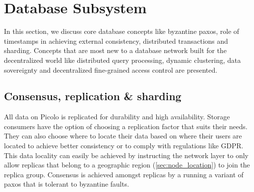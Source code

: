 \section{Database Subsystem}
In this section, we discuss core database concepts like byzantine paxos, role of timestamps in achieving external consistency, distributed transactions and sharding. Concepts that are most new to a database network built for the  decentralized world like distributed query processing, dynamic clustering, data sovereignty and decentralized fine-grained access control are presented.

\subsection{Consensus, replication \& sharding} \label{sec:paxos}
All data on Picolo is replicated for durability and high availability. Storage consumers have the option of choosing a replication factor that suits their needs. They can also choose where to locate their data based on where their users are located to achieve better consistency or to comply with regulations like GDPR. This data locality can easily be achieved by instructing the network layer to only allow replicas that belong to a geographic region (\cref{sec:node_location}) to join the replica group. Consensus is achieved amongst replicas by a running a variant of paxos that is tolerant to byzantine faults.
